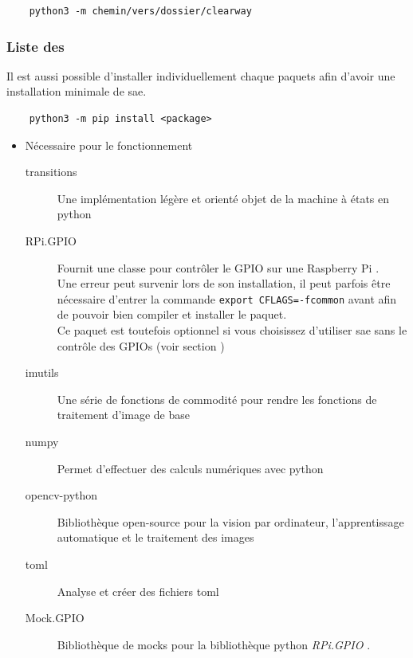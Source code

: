 \begin{verbatim}
    python3 -m chemin/vers/dossier/clearway
\end{verbatim}


\subsubsection{Liste des }
\label{sec:listePackages}

Il est aussi possible d'installer individuellement chaque \glspl{paquet} afin d'avoir une installation minimale de \gls{sae}.

\begin{verbatim}
    python3 -m pip install <package>
\end{verbatim}

\begin{itemize}
    \item Nécessaire pour le fonctionnement
          \begin{description}
              \item[transitions] Une implémentation légère et orienté objet de la machine à états en \gls{python} \cite{transition}
              \item[RPi.GPIO] Fournit une classe pour contrôler le GPIO sur une Raspberry Pi \cite{rpi_gpio}.\\
                  Une erreur peut survenir lors de son installation, il peut parfois être nécessaire d'entrer la commande
                  \texttt{export CFLAGS=-fcommon} avant afin de pouvoir bien compiler et installer le \gls{paquet}.\\
                  Ce \gls{paquet} est toutefois optionnel si vous choisissez d'utiliser \gls{sae} sans le contrôle des GPIOs
                  (voir section )
              \item[imutils] Une série de fonctions de commodité pour rendre les fonctions de traitement d'image de
                  base \cite{imutils}
              \item[numpy] Permet d’effectuer des calculs numériques avec \gls{python} \cite{numpy}
              \item[opencv-python] Bibliothèque open-source pour la vision par ordinateur, l'apprentissage automatique
                  et le traitement des images \cite{opencv}
              \item[toml] Analyse et créer des fichiers \gls{toml} \cite{python_toml}
              \item[Mock.GPIO] Bibliothèque de \glspl{mock} pour la bibliothèque \gls{python} \textit{RPi.GPIO} \cite{mock_gpio}.
          \end{description}


\end{itemize}
